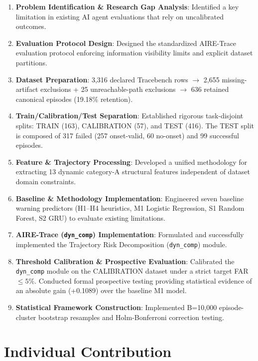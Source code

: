 \documentclass[12pt,a4paper]{article}
\begin{document}
\begin{enumerate}[label=\arabic*.]
    \item \textbf{Problem Identification \& Research Gap Analysis}: Identified a key limitation in existing AI agent evaluations that rely on uncalibrated outcomes.
    \item \textbf{Evaluation Protocol Design}: Designed the standardized AIRE-Trace evaluation protocol enforcing information visibility limits and explicit dataset partitions.
    \item \textbf{Dataset Preparation}: 3,316 declared Tracebench rows $\rightarrow$ 2,655 missing-artifact exclusions + 25 unreachable-path exclusions $\rightarrow$ 636 retained canonical episodes (19.18\% retention).
    \item \textbf{Train/Calibration/Test Separation}: Established rigorous task-disjoint splits: TRAIN (163), CALIBRATION (57), and TEST (416). The TEST split is composed of 317 failed (257 onset-valid, 60 no-onset) and 99 successful episodes.
    \item \textbf{Feature \& Trajectory Processing}: Developed a unified methodology for extracting 13 dynamic category-A structural features independent of dataset domain constraints.
    \item \textbf{Baseline \& Methodology Implementation}: Engineered seven baseline warning predictors (H1--H4 heuristics, M1 Logistic Regression, S1 Random Forest, S2 GRU) to evaluate existing limitations.
    \item \textbf{AIRE-Trace (\texttt{dyn\_comp}) Implementation}: Formulated and successfully implemented the Trajectory Risk Decomposition (\texttt{dyn\_comp}) module.
    \item \textbf{Threshold Calibration \& Prospective Evaluation}: Calibrated the \texttt{dyn\_comp} module on the CALIBRATION dataset under a strict target FAR $\le 5\%$. Conducted formal prospective testing providing statistical evidence of an absolute gain (+0.1089) over the baseline M1 model.
    \item \textbf{Statistical Framework Construction}: Implemented B=10,000 episode-cluster bootstrap resamples and Holm-Bonferroni correction testing.
\end{enumerate}

\newpage


\newpage

\section{Individual Contribution}
\end{document}

